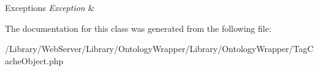 \begin{DoxyExceptions}{Exceptions}
{\em Exception} & \\
\hline
\end{DoxyExceptions}


The documentation for this class was generated from the following file\-:\begin{DoxyCompactItemize}
\item 
/\-Library/\-Web\-Server/\-Library/\-Ontology\-Wrapper/\-Library/\-Ontology\-Wrapper/Tag\-Cache\-Object.\-php\end{DoxyCompactItemize}
